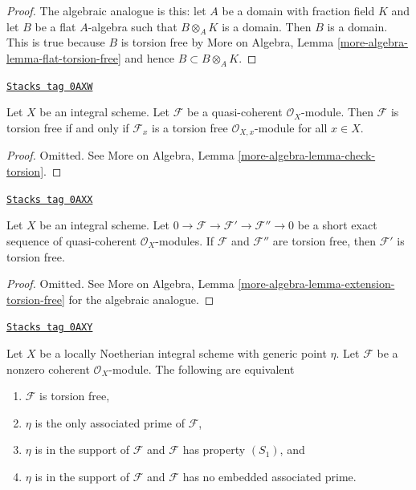 \begin{proof}
The algebraic analogue is this: let $A$ be a domain with fraction
field $K$ and let $B$ be a flat $A$-algebra such that $B \otimes_A K$
is a domain. Then $B$ is a domain. This is true because $B$ is
torsion free by More on Algebra, Lemma
\ref{more-algebra-lemma-flat-torsion-free}
and hence $B \subset B \otimes_A K$.
\end{proof}

\begin{lemma}
\label{divisors-lemma-check-torsion}
\href{https://stacks.math.columbia.edu/tag/0AXW}{\texttt{Stacks tag 0AXW}}

Let $X$ be an integral scheme. Let $\mathcal{F}$ be a quasi-coherent
$\mathcal{O}_X$-module. Then $\mathcal{F}$ is torsion free if and only if
$\mathcal{F}_x$ is a torsion free $\mathcal{O}_{X, x}$-module for all $x \in X$.
\end{lemma}

\begin{proof}
Omitted. See More on Algebra, Lemma
\ref{more-algebra-lemma-check-torsion}.
\end{proof}

\begin{lemma}
\label{divisors-lemma-extension-torsion-free}
\href{https://stacks.math.columbia.edu/tag/0AXX}{\texttt{Stacks tag 0AXX}}

Let $X$ be an integral scheme. Let
$0 \to \mathcal{F} \to \mathcal{F}' \to \mathcal{F}'' \to 0$
be a short exact sequence of quasi-coherent $\mathcal{O}_X$-modules.
If $\mathcal{F}$ and $\mathcal{F}''$ are torsion free, then $\mathcal{F}'$
is torsion free.
\end{lemma}

\begin{proof}
Omitted. See
More on Algebra, Lemma \ref{more-algebra-lemma-extension-torsion-free}
for the algebraic analogue.
\end{proof}

\begin{lemma}
\label{divisors-lemma-torsion-free-finite-noetherian-domain}
\href{https://stacks.math.columbia.edu/tag/0AXY}{\texttt{Stacks tag 0AXY}}

Let $X$ be a locally Noetherian integral scheme with generic point $\eta$.
Let $\mathcal{F}$ be a nonzero coherent $\mathcal{O}_X$-module.
The following are equivalent
\begin{enumerate}
\item $\mathcal{F}$ is torsion free,
\item $\eta$ is the only associated prime of $\mathcal{F}$,
\item $\eta$ is in the support of $\mathcal{F}$ and $\mathcal{F}$
has property $(S_1)$, and
\item $\eta$ is in the support of $\mathcal{F}$ and $\mathcal{F}$
has no embedded associated prime.
\end{enumerate}
\end{lemma}

